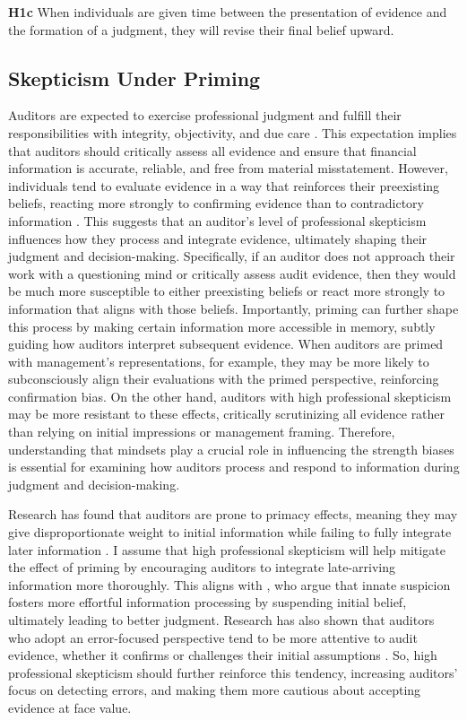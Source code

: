\documentclass[12pt,english]{article}
\begin{document}
\begin{center}
    \textbf{H1c} When individuals are given time between the presentation of evidence and the formation of a judgment, they will revise their final belief upward.
\end{center}

\subsection{Skepticism Under Priming}
Auditors are expected to exercise professional judgment and fulfill their responsibilities with integrity, objectivity, and due care \citep{aicpa2012}. This expectation implies that auditors should critically assess all evidence and ensure that financial information is accurate, reliable, and free from material misstatement. However, individuals tend to evaluate evidence in a way that reinforces their preexisting beliefs, reacting more strongly to confirming evidence than to contradictory information \citep{gorman1986}. This suggests that an auditor’s level of professional skepticism influences how they process and integrate evidence, ultimately shaping their judgment and decision-making. Specifically, if an auditor does not approach their work with a questioning mind or critically assess audit evidence, then they would be much more susceptible to either preexisting beliefs or react more strongly to information that aligns with those beliefs. Importantly, priming can further shape this process by making certain information more accessible in memory, subtly guiding how auditors interpret subsequent evidence. When auditors are primed with management’s representations, for example, they may be more likely to subconsciously align their evaluations with the primed perspective, reinforcing confirmation bias. On the other hand, auditors with high professional skepticism may be more resistant to these effects, critically scrutinizing all evidence rather than relying on initial impressions or management framing. Therefore, understanding that mindsets play a crucial role in influencing the strength biases \citep{alexopoulos2012} is essential for examining how auditors process and respond to information during judgment and decision-making.

Research has found that auditors are prone to primacy effects, meaning they may give disproportionate weight to initial information while failing to fully integrate later information \citep{evans1993, mcmillian1993, anderson1999}. I assume that high professional skepticism will help mitigate the effect of priming by encouraging auditors to integrate late-arriving information more thoroughly. This aligns with \citet{hilton1993}, who argue that innate suspicion fosters more effortful information processing by suspending initial belief, ultimately leading to better judgment. Research has also shown that auditors who adopt an error-focused perspective tend to be more attentive to audit evidence, whether it confirms or challenges their initial assumptions \citep{mcmillian1993}. So, high professional skepticism should further reinforce this tendency, increasing auditors’ focus on detecting errors, and making them more cautious about accepting evidence at face value. 
\end{document}
